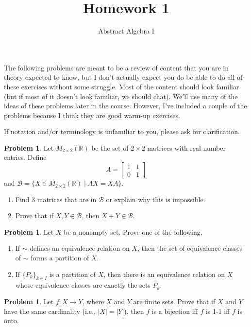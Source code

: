 \documentclass[11pt]{scrartcl}
\theoremstyle{definition}
\newtheorem{problem}[theorem]{Problem}
\newcommand{\blankline}{\pagebreak[2]\vspace{.5\baselineskip}}
\begin{document}
\title{Homework 1}
\subtitle{Abstract Algebra I}
\date{}

\maketitle
\thispagestyle{fancy}

The following problems are meant to be a review of content that you are in theory expected to know, but I don't actually expect you do be able to do all of these exercises without some struggle.  Most of the content should look familiar (but if most of it doesn't look familiar, we should chat).  We'll use many of the ideas of these problems later in the course.  However, I've included a couple of the problems because I think they are good warm-up exercises.

\blankline

If notation and/or terminology is unfamiliar to you, please ask for clarification.

\begin{problem}
Let $M_{2\times 2}(\mathbb{R})$ be the set of $2\times 2$ matrices with real number entries.  Define
\[
A=\begin{bmatrix}
1 & 1\\
0 & 1
\end{bmatrix}
\]
and $\mathcal{B}=\{X\in M_{2\times 2}(\mathbb{R})\mid AX=XA\}$.
\begin{enumerate}[label=\rm{(\alph*)}]
\item Find 3 matrices that are in $\mathcal{B}$ or explain why this is impossible.
\item Prove that if $X,Y\in\mathcal{B}$, then $X+Y\in\mathcal{B}$.
\end{enumerate}
\end{problem}

\begin{problem}
Let $X$ be a nonempty set.  Prove one of the following.
\begin{enumerate}[label=\rm{(\alph*)}]
\item If $\sim$ defines an equivalence relation on $X$, then the set of equivalence classes of $\sim$ forms a partition of $X$.
\item If $\{P_k\}_{k\in I}$ is a partition of $X$, then there is an equivalence relation on $X$ whose equivalence classes are exactly the sets $P_k$.
\end{enumerate}
\end{problem}

\begin{problem}
Let $f:X\to Y$, where $X$ and $Y$ are finite sets. Prove that if $X$ and $Y$ have the same cardinality (i.e., $|X|=|Y|$), then $f$ is a bijection iff $f$ is 1-1 iff $f$ is onto.
\end{problem}
\end{document}
